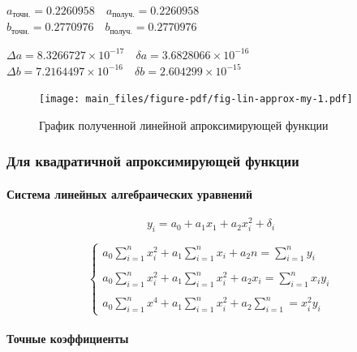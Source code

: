 \documentclass[
  letterpaper,
  DIV=11,
  numbers=noendperiod]{scrartcl}
\let\oldparagraph\paragraph
\renewcommand{\paragraph}[1]{\oldparagraph{#1}\mbox{}}
\begin{document}
\(a_{точн.} = 0.2260958 \quad a_{получ.} = 0.2260958\)\\
\(b_{точн.} = 0.2770976 \quad b_{получ.} = 0.2770976\)

\(\Delta a = \ensuremath{8.3266727\times 10^{-17}} \quad \delta a = \ensuremath{3.6828066\times 10^{-16}}\)\\
\(\Delta b = \ensuremath{7.2164497\times 10^{-16}} \quad \delta b = \ensuremath{2.604299\times 10^{-15}}\)

\begin{figure}

{\centering \texttt{[image: main\_files/figure-pdf/fig-lin-approx-my-1.pdf]}

}

\caption{\label{fig-lin-approx-my}График полученной линейной
апроксимирующей функции}

\end{figure}

\subsubsection{Для квадратичной апроксимирующей
функции}\label{ux434ux43bux44f-ux43aux432ux430ux434ux440ux430ux442ux438ux447ux43dux43eux439-ux430ux43fux440ux43eux43aux441ux438ux43cux438ux440ux443ux44eux449ux435ux439-ux444ux443ux43dux43aux446ux438ux438}

\paragraph{Система линейных алгебраических
уравнений}\label{ux441ux438ux441ux442ux435ux43cux430-ux43bux438ux43dux435ux439ux43dux44bux445-ux430ux43bux433ux435ux431ux440ux430ux438ux447ux435ux441ux43aux438ux445-ux443ux440ux430ux432ux43dux435ux43dux438ux439-1}

\[
y_i = a_0 + a_1 x_1 + a_2 x_i^2 + \delta_i
\]

\[
\begin{cases}
a_0 \sum_{i=1}^n x_i^2 + a_1 \sum_{i=1}^n x_i + a_2 n = \sum_{i=1}^n y_i \\ \\
a_0 \sum_{i=1}^n x_i^2 + a_1 \sum_{i=1}^n x_i^2 + a_2 x_i = \sum_{i=1}^n x_iy_i \\ \\
a_0 \sum_{i=1}^n x^4 + a_1 \sum_{i=1}^n x_i^2 + a_2 \sum_{i=1}^n = x_i^2y_i
\end{cases}
\]

\paragraph{Точные
коэффициенты}\label{ux442ux43eux447ux43dux44bux435-ux43aux43eux44dux444ux444ux438ux446ux438ux435ux43dux442ux44b}
\end{document}

